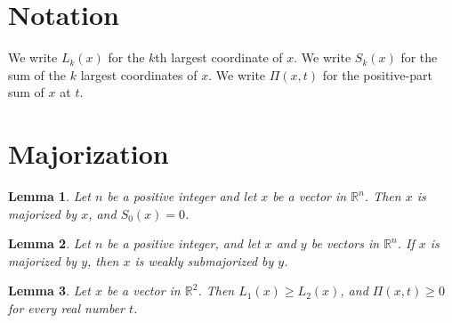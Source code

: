 \documentclass{article}
\newtheorem{lemma}{Lemma}
\begin{document}
\section{Notation}

We write $L_k(x)$ for the $k$th largest coordinate of $x$.
We write $S_k(x)$ for the sum of the $k$ largest coordinates of $x$.
We write $\Pi(x,t)$ for the positive-part sum of $x$ at $t$.

\section{Majorization}

\begin{lemma}\label{reflexive}
Let $n$ be a positive integer and let $x$ be a vector in $\mathbb{R}^n$. Then $x$ is majorized by $x$, and $S_0(x)=0$.
\end{lemma}

\begin{lemma}\label{weak}
Let $n$ be a positive integer, and let $x$ and $y$ be vectors in $\mathbb{R}^n$. If $x$ is majorized by $y$, then $x$ is weakly submajorized by $y$.
\end{lemma}

\begin{lemma}\label{order}
Let $x$ be a vector in $\mathbb{R}^2$. Then $L_1(x)\ge L_2(x)$, and $\Pi(x,t)\ge0$ for every real number $t$.
\end{lemma}
\end{document}
